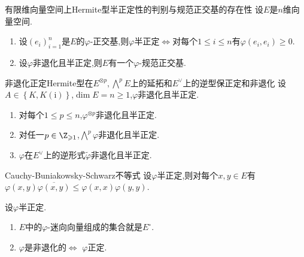 \begin{proposition}{有限维向量空间上Hermite型半正定性的判别与规范正交基的存在性}{}
	设$E$是$n$维向量空间.
	\begin{enumerate}
		\item 设$\left(e_{i}\right)_{i=1}^{n}$是$E$的$\varphi$-正交基,则$\varphi$半正定$\iff$对每个$1\leq i\leq n$有$\varphi\left(e_{i},e_{i}\right)\geq 0$.
		\item 设$\varphi$非退化且半正定,则$E$有一个$\varphi$-规范正交基.
	\end{enumerate}
\end{proposition}

\begin{proposition}{非退化正定Hermite型在$E^{\otimes p},\bigwedge\limits^{p}E$上的延拓和$E^{\vee}$上的逆型保正定和非退化}{}
	设$A\in\left\{K,K(\mathrm{i})\right\}$,$\dim E=n\geq 1$,$\varphi$非退化且半正定.
	\begin{enumerate}
		\item 对每个$1\leq p\leq n$,$\varphi^{\otimes p}$非退化且半正定.
		\item 对任一$p\in\Z_{\geqslant 1}$,$\bigwedge\limits^{p}\varphi$非退化且半正定.
		\item $\varphi$在$E^{\vee}$上的逆形式$\tilde{\varphi}$非退化且半正定.
	\end{enumerate}
\end{proposition}

\begin{proposition}{Cauchy-Buniakowsky-Schwarz不等式}{}
	设$\varphi$半正定,则对每个$x,y\in E$有$\varphi\left(x,y\right)\overline{\varphi\left(x,y\right)}\leq\varphi\left(x,x\right)\varphi\left(y,y\right)$.
\end{proposition}

\begin{corollary}{}{}
	设$\varphi$半正定.
	\begin{enumerate}
		\item $E$中的$\varphi$-迷向向量组成的集合就是$E^{\circ}$.
		\item $\varphi$是非退化的$\iff$ $\varphi$正定.
	\end{enumerate}
\end{corollary}

